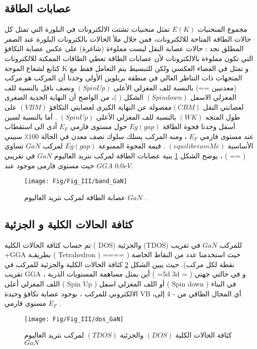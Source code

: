 \subsection*{عصابات الطاقة}

مجموع المنحنيات  $ E(K) $ تمثل منحنيات تشتت الالكترونات في البلورة التي تمثل كل حالات الطاقة المتاحة للالكترونات، فمن خلال ملأ الحالات بالكترونات البلورة عند الصفر المطلق نجد : حالات عصابة النقل ليست مملوءة (شاغرة) على عكس عصابة التكافؤ التي تكون مملوءة بالالكترونات لأن عصابات الطاقة تعطي الطاقات الممكنة للالكترونات كتابع لشعاع الموجة K و تمثل في الفضاء العكسي ولكن للتبسيط يتم التعامل فقط مع المتجهات ذات التناظر العالي في منطقة بريلوين الأولى وجدنا أن المركب هو مركب (معدنبين ==) بالنسبة للف المغزلي الأعلى $ ( Spin Up ) $ ونصف ناقل بالنسبة للف المغزلي الاسفل $ ( Spin down ) $ الشكل (  )، من الواضح أن النهاية الحدية الصغرى لعصابتي النقل $ ( CBM)  $مفصولة عن النهاية الكبرى لعصايتي التكافؤ $ ( VBM ) $ على طول المتجه $ (WK) $ بالنسبة للف المغزلي الأعلى $ ( Spin Up ) $ . أما بالنسبة لسين أسفل وحدنا فحوة الطاقة $ Eg ( gap ) $ حول مستوى فارمي $ E_{F} $ أدى الى استقطاب سبيني ‫‪٪‬‬100 عند مستوى فارمي $ E_{F} $ ، ومنه المركب يسلك سلوك نصف معدن في الحالة الأساسية $ (equilibrium Me ) $ . قيمة الفجوة الممنوعة $ Eg ( gap ) $ لمركب $ GaN $ تساوي  ( == ) ، يوضح الشكل \ref{fig:bandgan} بنية عصابات الطاقة لمركب  نتريد الغاليوم $ GaN  $ في تقريبي $ GGA $  حيث مستوى فارمی موجود عند $0.0 eV $.

\begin{figure}[h!]
	\centering
	\texttt{[image: Fig/Fig\_III/band\_GaN]}
	\caption{ عصابة الطاقة لمركب نتريد الغاليوم $ GaN  $ . }
	\label{fig:bandgan}
\end{figure}
\FloatBarrier

\subsection*{كثافة الحالات الكلية و الجزئية}

تم حساب كثافة الحالات الكلية ( DOS) والجزئية (TDOS) للمركب $ GaN $  في تقريب +GGA بطريقـة ( Tetrahedron ) حيث استخدمنا عدد من النقاط الخاصة ( ==== نقطة لكل مركب). حيث يبين الشكل \ref{fig:dosgan} كثافة الحالات الكلية والجزئية للمركب في تقريب GGA ، أين يمثل مساهمة المستويات الذرية ( =5d 3d = ) و في حالتي جهتي اللف المغزلي أعلى ( Spin Up ) أو اللف المغزلي اسفل ( Spin down ) في البناء الالكتروني للمركب ، بوجود عصاية تكافؤ وحيدة VB ،أي المجال الطاقي من - 4 إلى مستوى فارمي $ E_{F} $ . 

\begin{figure}[h!]
	\centering
	\texttt{[image: Fig/Fig\_III/dos\_GaN]}
	\caption{ كثافة الحالات الكلية $ ( DOS) $ والجزئية $ (TDOS) $ لمركب نتريد الغاليوم  $ GaN $   }
	\label{fig:dosgan}
\end{figure}
\FloatBarrier

